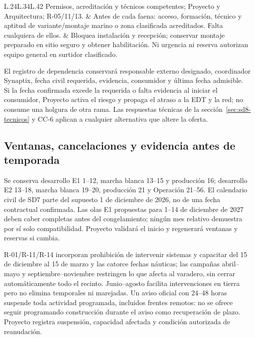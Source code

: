 \begin{longtable}{L{\dimexpr.24\tabcolsep\relax}L{\dimexpr.34\tabcolsep\relax}L{\dimexpr.42\tabcolsep\relax}}
Permisos, acreditación y técnicos competentes; Proyecto y Arquitectura; R-05/11/13. & Antes de cada faena: acceso, formación, técnico y aptitud de variante/montaje marino o zona clasificada acreditados. Falta cualquiera de ellos. & Bloquea instalación y recepción; conservar montaje preparado en sitio seguro y obtener habilitación. Ni urgencia ni reserva autorizan equipo general en surtidor clasificado.\\\hline
\end{longtable}\endgroup
{}
El registro de dependencia conservará responsable externo designado, coordinador Synaptix, fecha civil requerida, evidencia, consumidor y última fecha admisible. Si la fecha confirmada excede la requerida o falta evidencia al iniciar el consumidor, Proyecto activa el riesgo y propaga el atraso a la EDT y la red; no consume una holgura de otra rama. Las respuestas técnicas de la sección~\ref{sec:sd8-tecnicos} y CC-6 aplican a cualquier alternativa que altere la oferta.

\subsection{Ventanas, cancelaciones y evidencia antes de temporada}\label{sec:sd8-ventanas-p05}
Se conserva desarrollo E1 1--12, marcha blanca 13--15 y producción 16; desarrollo E2 13--18, marcha blanca 19--20, producción 21 y Operación 21--56. El calendario civil de SD7 parte del supuesto 1 de diciembre de 2026, no de una fecha contractual confirmada. Las olas E1 propuestas para 1--14 de diciembre de 2027 deben caber completas antes del congelamiento; ningún mes relativo demuestra por sí solo compatibilidad. Proyecto validará el inicio y regenerará ventanas y reservas si cambia. \parencite[art.~17; pp.~12--13]{sd8-ba}

R-01/R-11/R-14 incorporan prohibición de intervenir sistemas y capacitar del 15 de diciembre al 15 de marzo y las catorce fechas náuticas; las campañas abril--mayo y septiembre--noviembre restringen lo que afecta al varadero, sin cerrar automáticamente todo el recinto. Junio--agosto facilita intervenciones en tierra pero no elimina temporales ni marejadas. Un aviso oficial con 24--48 horas suspende toda actividad programada, incluidos frentes remotos: no se ofrece seguir programando construcción durante el aviso como recuperación de plazo. Proyecto registra suspensión, capacidad afectada y condición autorizada de reanudación. \parencite[restricciones 11--12; numeral 13.2; Anexo B.2]{sd8-c07}

